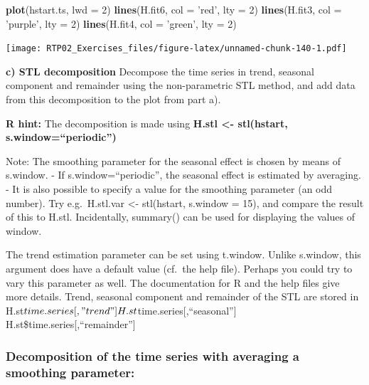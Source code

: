 \documentclass[
]{article}
\newenvironment{Shaded}{\begin{snugshade}}{\end{snugshade}}
\newcommand{\DataTypeTok}[1]{\textcolor[rgb]{0.13,0.29,0.53}{#1}}
\newcommand{\DecValTok}[1]{\textcolor[rgb]{0.00,0.00,0.81}{#1}}
\newcommand{\KeywordTok}[1]{\textcolor[rgb]{0.13,0.29,0.53}{\textbf{#1}}}
\newcommand{\NormalTok}[1]{#1}
\newcommand{\StringTok}[1]{\textcolor[rgb]{0.31,0.60,0.02}{#1}}
\begin{document}
\begin{Shaded}
\begin{Highlighting}[]
\KeywordTok{plot}\NormalTok{(hstart.ts, }\DataTypeTok{lwd =} \DecValTok{2}\NormalTok{)}
\KeywordTok{lines}\NormalTok{(H.fit6, }\DataTypeTok{col =} \StringTok{'red'}\NormalTok{, }\DataTypeTok{lty =} \DecValTok{2}\NormalTok{)}
\KeywordTok{lines}\NormalTok{(H.fit3, }\DataTypeTok{col =} \StringTok{'purple'}\NormalTok{, }\DataTypeTok{lty =} \DecValTok{2}\NormalTok{)}
\KeywordTok{lines}\NormalTok{(H.fit4, }\DataTypeTok{col =} \StringTok{'green'}\NormalTok{, }\DataTypeTok{lty =} \DecValTok{2}\NormalTok{)}
\end{Highlighting}
\end{Shaded}

\texttt{[image: RTP02\_Exercises\_files/figure-latex/unnamed-chunk-140-1.pdf]}

\textbf{c) STL decomposition} Decompose the time series in trend,
seasonal component and remainder using the non-parametric STL method,
and add data from this decomposition to the plot from part a).

\textbf{R hint:} The decomposition is made using \textbf{H.stl
\textless- stl(hstart, s.window=``periodic'')}

Note: The smoothing parameter for the seasonal effect is chosen by means
of s.window. - If s.window=``periodic'', the seasonal effect is
estimated by averaging. - It is also possible to specify a value for the
smoothing parameter (an odd number). Try e.g.~H.stl.var \textless-
stl(hstart, s.window = 15), and compare the result of this to H.stl.
Incidentally, summary() can be used for displaying the values of window.

The trend estimation parameter can be set using t.window. Unlike
s.window, this argument does have a default value (cf.~the help file).
Perhaps you could try to vary this parameter as well. The documentation
for R and the help files give more details. Trend, seasonal component
and remainder of the STL are stored in
H.st\(time.series[,"trend"] H.st\)time.series{[},``seasonal''{]}
H.st\$time.series{[},``remainder''{]}

\hypertarget{decomposition-of-the-time-series-with-averaging-a-smoothing-parameter}{%
\subsubsection{Decomposition of the time series with averaging a
smoothing
parameter:}\label{decomposition-of-the-time-series-with-averaging-a-smoothing-parameter}}
\end{document}
